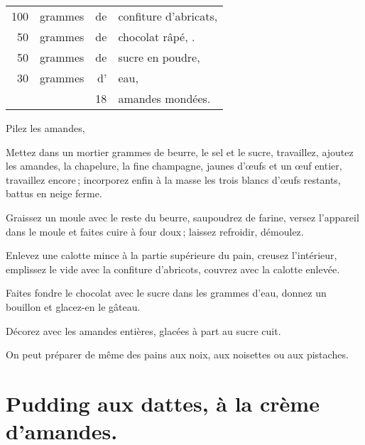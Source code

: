 \footnotesize
\begin{longtable}{rrrp{16em}}
    100 & grammes & de & confiture d'abricats,                                                            \\
     50 & grammes & de & chocolat râpé, .                                                                 \\
     50 & grammes & de & sucre en poudre,                                                                 \\
     30 & grammes & d' & eau,                                                                             \\
        &         & 18 & amandes mondées.                                                                 \\
\end{longtable}
\normalsize

Pilez les amandes,

Mettez dans un mortier {\mmm} grammes de beurre, le sel et le sucre,
travaillez, ajoutez les amandes, la chapelure, la fine champagne, {\mmm}
jaunes d'œufs et un œuf entier, travaillez encore ; incorporez enfin à la masse
les trois blancs d'œufs restants, battus en neige ferme.

Graissez un moule avec le reste du beurre, saupoudrez de farine, versez l'appareil
dans le moule et faites cuire à four doux ; laissez refroidir, démoulez.

Enlevez une calotte mince à la partie supérieure du pain, creusez l'intérieur,
emplissez le vide avec la confiture d'abricots, couvrez avec la calotte enlevée.

Faites fondre le chocolat avec le sucre dans les {\mmm} grammes d'eau,
donnez un bouillon et glacez-en le gâteau.

Décorez avec les {\mmm} amandes entières, glacées à part au sucre cuit.

\sk

On peut préparer de même des pains aux noix, aux noisettes ou aux pistaches.

\section*{\centering Pudding aux dattes, à la crème d'amandes.}
{}

